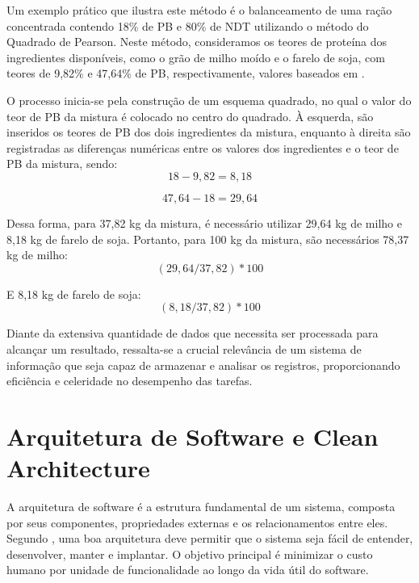 Um exemplo prático que ilustra este método é o balanceamento de uma ração concentrada contendo 18\% de \gls{PB} e 80\% de \gls{NDT} utilizando o método do Quadrado de Pearson. Neste método, consideramos os teores de proteína dos ingredientes disponíveis, como o grão de milho moído e o farelo de soja, com teores de 9,82\% e 47,64\% de \gls{PB}, respectivamente, valores baseados em .

O processo inicia-se pela construção de um esquema quadrado, no qual o valor do teor de \gls{PB} da mistura é colocado no centro do quadrado. À esquerda, são inseridos os teores de \gls{PB} dos dois ingredientes da mistura, enquanto à direita são registradas as diferenças numéricas entre os valores dos ingredientes e o teor de \gls{PB} da mistura, sendo: 
\begin{equation}
  \label{eq:pearson1}
  18 - 9,82 = 8,18
\end{equation}

\begin{equation}
  \label{eq:pearson2}
  47,64 - 18 = 29,64
\end{equation}

Dessa forma, para 37,82 kg da mistura, é necessário utilizar 29,64 kg de milho e 8,18 kg de farelo de soja. Portanto, para 100 kg da mistura, são necessários 78,37 kg de milho:
\begin{equation}
 \label{eq:pearson3}
 (29,64 / 37,82)*100 
\end{equation}

E 8,18 kg de farelo de soja:
\begin{equation}
 \label{eq:pearson4}
 (8,18 / 37,82)*100
\end{equation}

Diante da extensiva quantidade de dados que necessita ser processada para alcançar um resultado, ressalta-se a crucial relevância de um sistema de informação que seja capaz de armazenar e analisar os registros, proporcionando eficiência e celeridade no desempenho das tarefas.

\section{Arquitetura de Software e Clean Architecture}\label{sec:arquiteturaSoftware}

A arquitetura de software é a estrutura fundamental de um sistema, composta por seus componentes, propriedades externas e os relacionamentos entre eles. Segundo , uma boa arquitetura deve permitir que o sistema seja fácil de entender, desenvolver, manter e implantar. O objetivo principal é minimizar o custo humano por unidade de funcionalidade ao longo da vida útil do software.

